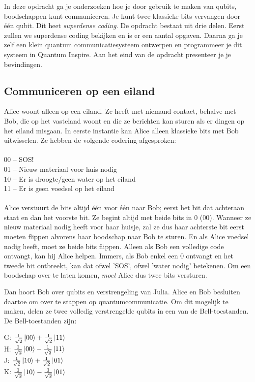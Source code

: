 \documentclass[../../main.tex]{subfiles}
\begin{document}
In deze opdracht ga je onderzoeken hoe je door gebruik te maken van qubits, boodschappen kunt communiceren. Je kunt twee klassieke bits vervangen door \'e\'en qubit. Dit heet \textit{superdense coding}. De opdracht bestaat uit drie delen. Eerst zullen we superdense coding bekijken en is er een aantal opgaven. Daarna ga je zelf een klein quantum communicatiesysteem ontwerpen en programmeer je dit systeem in Quantum Inspire. Aan het eind van de opdracht presenteer je je bevindingen.

\subsection*{Communiceren op een eiland}
Alice woont alleen op een eiland. Ze heeft met niemand contact, behalve met Bob, die op het vasteland woont en die ze berichten kan sturen als er dingen op het eiland misgaan. In eerste instantie kan Alice alleen klassieke bits met Bob uitwisselen. Ze hebben de volgende codering afgesproken:\\
\\
00 – SOS!\\
01 – Nieuw materiaal voor huis nodig\\
10 – Er is droogte/geen water op het eiland\\
11 – Er is geen voedsel op het eiland\\
\\
Alice verstuurt de bits altijd \'{e}\'{e}n voor \'{e}\'{e}n naar Bob; eerst het bit dat achteraan staat en dan het voorste bit. Ze begint altijd met beide bits in 0 (00). Wanneer ze nieuw materiaal nodig heeft voor haar huisje, zal ze dus haar achterste bit eerst moeten flippen alvorens haar boodschap naar Bob te sturen. En als Alice voedsel nodig heeft, moet ze beide bits flippen. Alleen als Bob een volledige code ontvangt, kan hij Alice helpen. Immers, als Bob enkel een 0 ontvangt en het tweede bit ontbreekt, kan dat ofwel 'SOS', ofwel 'water nodig' betekenen. Om een boodschap over te laten komen, \emph{moet} Alice dus twee bits versturen.

Dan hoort Bob over qubits en verstrengeling van Julia. Alice en Bob besluiten daartoe om over te stappen op quantumcommunicatie. Om dit mogelijk te maken, delen ze twee volledig verstrengelde qubits in een van de Bell-toestanden. De Bell-toestanden zijn:

G: $\tfrac{1}{\sqrt{2}}\ket{00}+\tfrac{1}{\sqrt{2}}\ket{11}$\\
H: $\tfrac{1}{\sqrt{2}}\ket{00}-\tfrac{1}{\sqrt{2}}\ket{11}$\\
J: $\tfrac{1}{\sqrt{2}}\ket{10}+\tfrac{1}{\sqrt{2}}\ket{01}$\\
K: $\tfrac{1}{\sqrt{2}}\ket{10}-\tfrac{1}{\sqrt{2}}\ket{01}$\\
\end{document}
